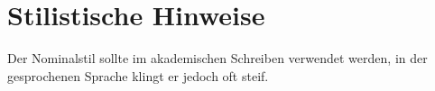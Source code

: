\section{Stilistische Hinweise}
\label{sec:NominalstilHinweise}

\begin{center}
\end{center}

Der Nominalstil sollte im akademischen Schreiben verwendet werden, in der gesprochenen Sprache klingt er jedoch oft steif.

\chapterend
